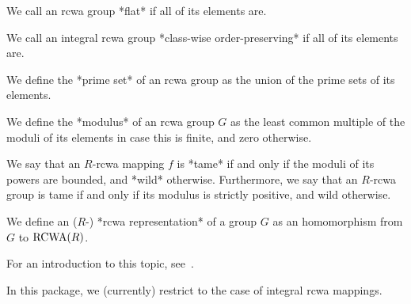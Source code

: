 We call an rcwa group *flat* if all of its elements are.

We call an integral rcwa group *class-wise order-preserving* if all of
its elements are.

We define the *prime set* of an rcwa group as the union of the prime sets
of its elements.

We define the *modulus* of an rcwa group $G$ as the least common multiple
of the moduli of its elements in case this is finite, and zero otherwise.

We say that an $R$-rcwa mapping $f$ is *tame* if and only if
the moduli of its powers are bounded, and *wild* otherwise.
Furthermore, we say that an $R$-rcwa group is tame if and only if
its modulus is strictly positive, and wild otherwise.

We define an ($R$-) *rcwa representation* of a group $G$ as an
homomorphism from $G$ to ${\rm RCWA}(R)$.

For an introduction to this topic, see~\cite{Kohl01}.

In this package, we (currently) restrict to the case of integral
rcwa mappings.

